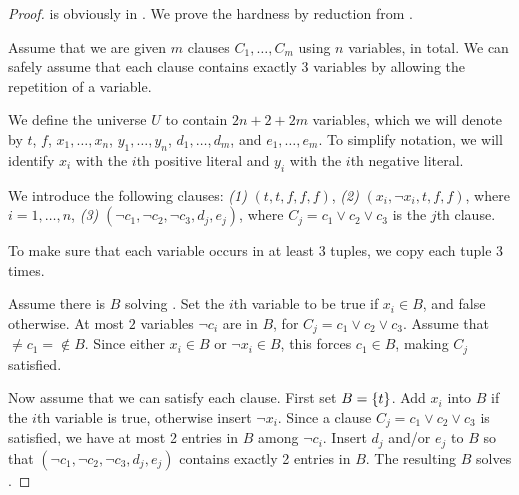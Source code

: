 \begin{proof}
\tuples is obviously in \np. We prove the hardness by reduction from \tsat.

Assume that we are given $m$ clauses $C_1, \ldots, C_m$ using $n$ variables, in
total. We can safely assume that each clause contains exactly 3 variables by
allowing the repetition of a variable.

We define the universe $U$ to contain $2n + 2 + 2m$ variables, which we will
denote by $t$, $f$, $x_1, \ldots, x_n$, $y_1, \ldots, y_n$,
$d_1, \ldots, d_m$, and $e_1, \ldots, e_m$.
To simplify notation,
we will identify $x_i$ with the $i$th positive literal and $y_i$ with the $i$th negative literal. 

We introduce the following clauses:
\emph{(1)} $(t, t, f, f, f)$,
\emph{(2)} $(x_i, \neg x_i, t, f, f)$, where $i = 1, \ldots, n$,
\emph{(3)}
$(\neg c_1, \neg c_2, \neg c_3, d_j, e_j)$, where $C_j = c_{1} \lor c_{2} \lor c_{3}$
is the $j$th clause.

To make sure that each variable occurs in at least 3 tuples, we copy each tuple
3 times.


Assume there is $B$ solving \tuples. Set the $i$th variable to be true if $x_i \in B$, and false otherwise.
At most $2$ variables $\neg c_i$ are in $B$, for $C_j = c_{1} \lor c_{2} \lor c_{3}$.
Assume that $\neq c_1 = \notin B$.
Since either $x_i \in B$ or $\neg x_i \in B$, this forces $c_1 \in B$, 
making $C_j$ satisfied.

Now assume that we can satisfy each clause. First set $B = \left\{t\right\}$. Add
$x_i$ into $B$ if the $i$th variable is true, otherwise insert $\neg x_i$.
Since a clause $C_j = c_{1} \lor c_{2} \lor c_{3}$ is satisfied, we have at most 2 entries in $B$ among $\neg c_i$. 
Insert $d_j$ and/or $e_j$ to $B$ so that $(\neg c_1, \neg c_2, \neg c_3, d_j, e_j)$ contains exactly 2 entries in $B$.
The resulting $B$ solves \tuples.
\end{proof}


